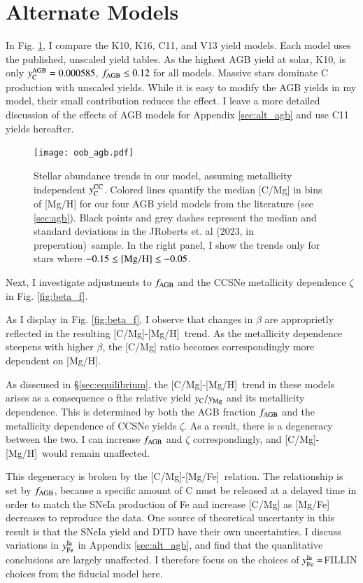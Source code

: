 \documentclass[12pt,oneside]{report}
\newcommand{\caah}{[C/Mg]-[Mg/H]}
\newcommand{\caafe}{[C/Mg]-[Mg/Fe]}
\newcommand{\Ycc}{\ensuremath{y_{\rm C}^{\rm CC}}}
\newcommand{\Ycagb}{\ensuremath{y_{\rm C}^{\rm AGB}}}
\newcommand{\citetjack}{JRoberts et. al (2023, in preperation)}
\begin{document}
\section{Alternate Models}

In Fig. \ref{fig:agb_sims}, I compare the K10, K16, C11, and V13 yield models. Each model uses the published, unscaled yield tables. As the highest AGB yield at solar, K10, is only $\Ycagb=0.000585$, $f_{\rm AGB} \leq 0.12$ for all models. Massive stars dominate C production with unscaled yields.  While it is easy to modify the AGB yields in my model, their small contribution reduces the effect. I leave a more detailed discussion of the effects of AGB models for Appendix \ref{sec:alt_agb} and use C11 yields hereafter.

\begin{figure}
\centering
\texttt{[image: oob\_agb.pdf]}
\caption[AGB GCE Models]{
    Stellar abundance trends in our model, assuming metallicity independent $\Ycc$. Colored lines quantify the median [C/Mg] in bins of [Mg/H] for our four AGB yield models from the literature (see \ref{sec:agb}). Black points and grey dashes represent the median and standard deviations in the \citetjack~sample. In the right panel, I show the trends only for stars where $-0.15\leq {\rm [Mg/H]}\leq -0.05$.
}
\label{fig:agb_sims}
\end{figure}

Next, I investigate adjustments to $f_{\rm AGB}$ and the CCSNe metallicity dependence $\zeta$ in Fig. \ref{fig:beta_f}. 

As I display in Fig. \ref{fig:beta_f}, I observe that changes in $\beta$ are
approprietly reflected in the resulting \caah~trend. As the metallicity
dependence steepens with higher $\beta$, the [C/Mg] ratio becomes
correspondingly more dependent on [Mg/H].

As disscused in \S\ref{sec:equilibrium}, the \caah~trend in these models arises as a consequence o fthe relative yield $y_{\rm C}/y_{\rm Mg}$ and its metallicity dependence. This is determined by both the AGB fraction $f_{\rm AGB}$ and the metallicity dependence of CCSNe yields $\zeta$. As a result, there is a degeneracy between the two. I can increase $f_{\rm AGB}$ and $\zeta$ correspondingly, and \caah~would remain unaffected.

This degeneracy is broken by the \caafe~relation. The relationship is set by $f_{\rm AGB}$, because a specific amount of C must be released at a delayed time in order to match the SNeIa production of Fe and increase [C/Mg] as [Mg/Fe] decreases to reproduce the data.
One source of theoretical uncertanty in this result is that the SNeIa yield and DTD have their own uncertainties. I discuss variations in $y_{\rm Fe}^{\rm Ia}$ in Appendix \ref{sec:alt_agb}, and find that the quanlitative conclusions are largely unaffected. I therefore focus on the choices of $y_{\rm Fe}^{\rm Ia} = $FILLIN choices from the fiducial model here.
\end{document}
